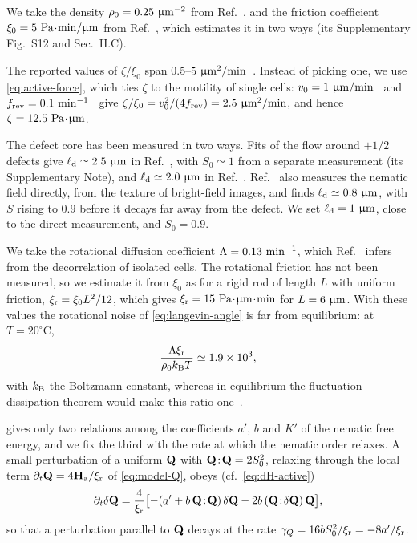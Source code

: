 \documentclass[aps,pre,reprint,superscriptaddress,longbibliography,nofootinbib
]{revtex4-2}
\begin{document}
We take the density $\rho_0=0.25~\micron^{-2}$ from
Ref.~\cite{copenhagen2021}, and the friction coefficient
$\xi_0=5~\Pa\tcdot\minute/\micron$ from
Ref.~\cite{han2025local}, which estimates it in two ways
(its Supplementary Fig.~S12 and Sec.~II.C).

The reported values of $\zeta/\xi_0$ span
$0.5$--$5~\micron^2/\minute$~\cite{han2025local,
copenhagen2021}. Instead of picking one, we use
\cref{eq:active-force}, which ties $\zeta$ to the motility
of single cells:
$v_0=1~\micron/\minute$~\cite{copenhagen2021} and
$\frev=0.1~\minute^{-1}$~\cite{liu2019selfdriven} give
$\zeta/\xi_0=v_0^2/(4\frev)=2.5~\micron^2/\minute$, and
hence $\zeta=12.5~\Pa\tcdot\micron$.

The defect core has been measured in two ways. Fits of the
flow around $+1/2$ defects give $\elld\simeq2.5~\micron$ in
Ref.~\cite{copenhagen2021}, with $S_0\simeq1$ from a
separate measurement (its Supplementary Note), and
$\elld\simeq2.0~\micron$ in Ref.~\cite{han2025local}.
Ref.~\cite{han2025local} also measures the nematic field
directly, from the texture of bright-field images, and
finds $\elld\simeq0.8~\micron$, with $S$ rising to $0.9$
before it decays far away from the defect. We set
$\elld=1~\micron$, close to the direct measurement, and
$S_0=0.9$.

We take the rotational diffusion coefficient
$\Lambda=0.13~\minute^{-1}$, which
Ref.~\cite{liu2019selfdriven} infers from the decorrelation
of isolated cells. The rotational friction has not been
measured, so we estimate it from $\xi_0$ as for a rigid rod
of length $L$ with uniform friction, $\xir=\xi_0L^2/12$,
which gives $\xir=15~\Pa\tcdot\micron\tcdot\minute$ for
$L=6~\micron$. With these values the rotational noise of
\cref{eq:langevin-angle} is far from equilibrium: at
$T=20^\circ\mathrm C$,
\begin{equation}
  \label{eq:rotational-fdt}
  \frac{\Lambda\xir}{\rho_0\kB T}\simeq1.9\times10^3,
\end{equation}
with $\kB$ the Boltzmann constant, whereas in equilibrium
the fluctuation-dissipation theorem would make this ratio
one~\cite{kubo1966fluctuation}.

 gives only two relations among the
coefficients $a'$, $b$ and $K'$ of the nematic free energy,
and we fix the third with the rate at which the nematic
order relaxes. A small perturbation of a uniform $\Q$ with
$\Q\!:\!\Q=2S_0^2$, relaxing through the local term
$\partial_t\Q=4\Ha/\xir$ of \cref{eq:model-Q}, obeys
(cf.~\cref{eq:dH-active})
\begin{equation}
  \label{eq:relaxation-rate}
  \partial_t\delta\Q=\frac4{\xir}\bigl[-(a'+b\,\Q\!:\!\Q)\,\delta\Q
  -2b\,(\Q\!:\!\delta\Q)\,\Q\bigr],
\end{equation}
so that a perturbation parallel to $\Q$ decays at the rate
$\gamma_Q=16bS_0^2/\xir=-8a'/\xir$.
\end{document}
